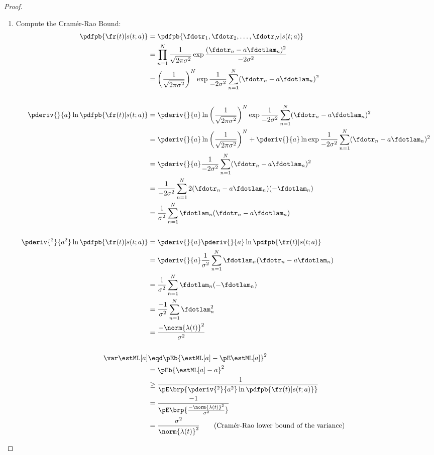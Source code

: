 \begin{proof}
\begin{enumerate}
\item Compute the Cram\'er-Rao Bound:
\begin{align*}
   \pdfpb{\fr(t)|s(t; a)}
     &=  \pdfpb{\fdotr_1, \fdotr_2,\ldots,\fdotr_N|s(t; a)}
   \\&=  \prod_{n=1}^N \frac{1}{\sqrt{2\pi\sigma^2}}
          \exp{\frac{(\fdotr_n- a\fdotlam_n)^2}{-2\sigma^2}}
   \\&=  \left(\frac{1}{\sqrt{2\pi\sigma^2}}\right)^N
          \exp{\frac{1}{-2\sigma^2} \sum_{n=1}^N (\fdotr_n- a\fdotlam_n)^2}
\\
\\
   \pderiv{}{a}\ln\pdfpb{\fr(t)|s(t; a)}
     &=  \pderiv{}{a}\ln
          \left(\frac{1}{\sqrt{2\pi\sigma^2}}\right)^N
          \exp{\frac{1}{-2\sigma^2} \sum_{n=1}^N (\fdotr_n- a\fdotlam_n)^2}
   \\&=  \pderiv{}{a}\ln
          \left(\frac{1}{\sqrt{2\pi\sigma^2}}\right)^N
       +  \pderiv{}{a}\ln
          \exp{\frac{1}{-2\sigma^2} \sum_{n=1}^N (\fdotr_n- a\fdotlam_n)^2}
   \\&=  \pderiv{}{a}
          \frac{1}{-2\sigma^2} \sum_{n=1}^N (\fdotr_n- a\fdotlam_n)^2
   \\&=  \frac{1}{-2\sigma^2} \sum_{n=1}^N 2(\fdotr_n- a\fdotlam_n)(- \fdotlam_n)
   \\&=  \frac{1}{\sigma^2} \sum_{n=1}^N \fdotlam_n(\fdotr_n- a\fdotlam_n)
\\
\\
   \pderiv{^2}{a^2}\ln\pdfpb{\fr(t)|s(t; a)}
     &=  \pderiv{}{a}\pderiv{}{a}\ln\pdfpb{\fr(t)|s(t; a)}
   \\&=  \pderiv{}{a}
          \frac{1}{\sigma^2} \sum_{n=1}^N \fdotlam_n(\fdotr_n- a\fdotlam_n)
   \\&=  \frac{1}{\sigma^2} \sum_{n=1}^N \fdotlam_n(-\fdotlam_n)
   \\&=  \frac{-1}{\sigma^2} \sum_{n=1}^N \fdotlam_n^2
   \\&=  \frac{-\norm{\lambda(t)}^2}{\sigma^2}
\\
\\
   \var\estML[a]
     &\eqd \pEb{\estML[a]-\pE\estML[a]}^2
   \\&=    \pEb{\estML[a]- a}^2
   \\&\ge  \frac{-1}{\pE\brp{\pderiv{^2}{ a^2} \ln \pdfpb{\fr(t)|s(t; a)}}}
   \\&=    \frac{-1}{\pE\brp{\frac{-\norm{\lambda(t)}^2}{\sigma^2}}}
   \\&=    \frac{\sigma^2}{\norm{\lambda(t)}^2}
     \qquad\text{(Cram\'er-Rao lower bound of the variance)}
\end{align*}


\end{enumerate}
\end{proof}
